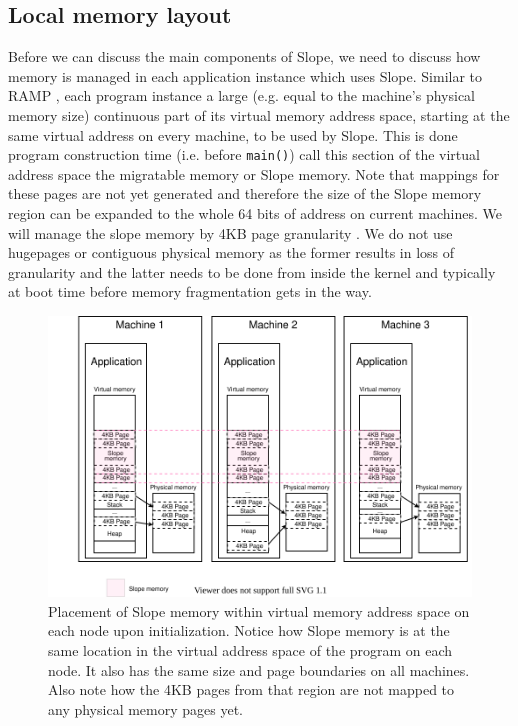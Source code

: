 \subsection{Local memory layout}
Before we can discuss the main components of Slope, we need to discuss how
memory is managed in each application instance which uses Slope. Similar to
RAMP \cite{memon2018ramp}, each program instance  a
large   (e.g. equal to the machine's physical memory size) continuous part
of its virtual memory address space, starting at the same virtual address
on every machine, to be used by Slope.
This is done  program construction
time (i.e. before \texttt{main()})  call this section of the virtual
address space the migratable memory or Slope memory. Note that mappings for
these pages are not yet generated and therefore the size of the Slope memory
region can be expanded to the whole 64 bits of address on current machines.
We will manage the slope memory by 4KB page granularity .
We do not use 
hugepages or contiguous physical memory as the former results in
loss of granularity and the latter needs to be done from inside the kernel and
typically at boot time before memory fragmentation gets in the way.

\begin{figure}
\centering
{}
\includegraphics[width=1\textwidth]{local-memory-management-phys-log.drawio}
\caption{
    Placement of Slope memory within virtual memory address space on each node
    upon initialization.
    Notice how Slope memory is at the same location in the virtual address
    space of the program on each node. It also has the same size and
    page boundaries on all machines. Also note how
    the 4KB pages from that region are not mapped to any physical memory pages
    yet.
}
\label{fig:localmemorymanagementphyslog}
\end{figure}

